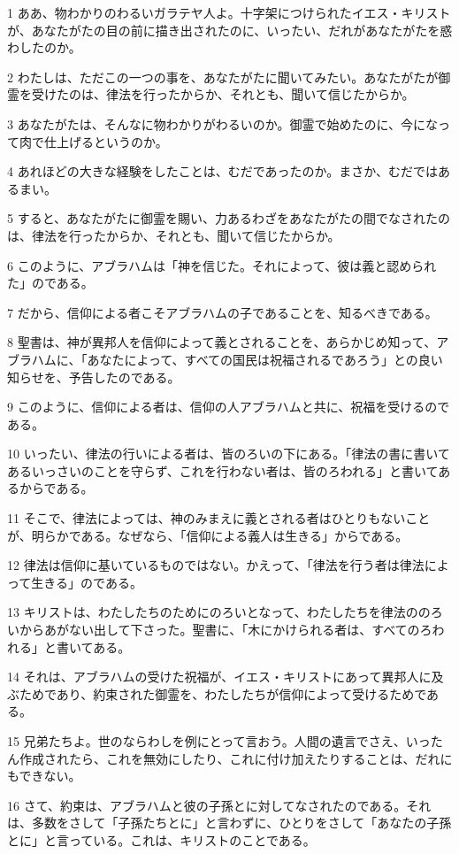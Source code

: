 \par 1 ああ、物わかりのわるいガラテヤ人よ。十字架につけられたイエス・キリストが、あなたがたの目の前に描き出されたのに、いったい、だれがあなたがたを惑わしたのか。
\par 2 わたしは、ただこの一つの事を、あなたがたに聞いてみたい。あなたがたが御霊を受けたのは、律法を行ったからか、それとも、聞いて信じたからか。
\par 3 あなたがたは、そんなに物わかりがわるいのか。御霊で始めたのに、今になって肉で仕上げるというのか。
\par 4 あれほどの大きな経験をしたことは、むだであったのか。まさか、むだではあるまい。
\par 5 すると、あなたがたに御霊を賜い、力あるわざをあなたがたの間でなされたのは、律法を行ったからか、それとも、聞いて信じたからか。
\par 6 このように、アブラハムは「神を信じた。それによって、彼は義と認められた」のである。
\par 7 だから、信仰による者こそアブラハムの子であることを、知るべきである。
\par 8 聖書は、神が異邦人を信仰によって義とされることを、あらかじめ知って、アブラハムに、「あなたによって、すべての国民は祝福されるであろう」との良い知らせを、予告したのである。
\par 9 このように、信仰による者は、信仰の人アブラハムと共に、祝福を受けるのである。
\par 10 いったい、律法の行いによる者は、皆のろいの下にある。「律法の書に書いてあるいっさいのことを守らず、これを行わない者は、皆のろわれる」と書いてあるからである。
\par 11 そこで、律法によっては、神のみまえに義とされる者はひとりもないことが、明らかである。なぜなら、「信仰による義人は生きる」からである。
\par 12 律法は信仰に基いているものではない。かえって、「律法を行う者は律法によって生きる」のである。
\par 13 キリストは、わたしたちのためにのろいとなって、わたしたちを律法ののろいからあがない出して下さった。聖書に、「木にかけられる者は、すべてのろわれる」と書いてある。
\par 14 それは、アブラハムの受けた祝福が、イエス・キリストにあって異邦人に及ぶためであり、約束された御霊を、わたしたちが信仰によって受けるためである。
\par 15 兄弟たちよ。世のならわしを例にとって言おう。人間の遺言でさえ、いったん作成されたら、これを無効にしたり、これに付け加えたりすることは、だれにもできない。
\par 16 さて、約束は、アブラハムと彼の子孫とに対してなされたのである。それは、多数をさして「子孫たちとに」と言わずに、ひとりをさして「あなたの子孫とに」と言っている。これは、キリストのことである。

